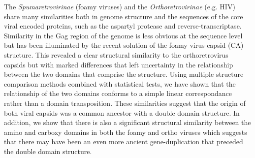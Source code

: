 The {\em Spumaretrovirinae} (foamy viruses) and the {\em Orthoretrovirinae} (e.g. HIV) share
many similarities both in genome structure and the sequences of the core viral encoded proteins,
such as the aspartyl protease and reverse-transcriptase.  Similarity in the Gag region of the 
genome is less obvious at the sequence level but has been illuminated by the recent solution of
the foamy virus capsid (CA) structure.   This revealed a clear structural similarity to the 
orthoretrovirus capsids but with marked differences that left uncertainty in the relationship
between the two domains that comprise the structure.   Using multiple structure comparison
methods combined with statistical tests, we have shown that the relationship of the two domains
conforms to a simple linear correspondance rather than a domain transposition.   These
similarities suggest that the origin of both viral capsids was a common ancestor with a double
domain structure.  In addition, we show that there is also a significant structural similarity 
between the amino and carboxy domains in both the foamy and ortho viruses which suggests that
there may have been an even more ancient gene-duplication that preceded the double domain structure.
